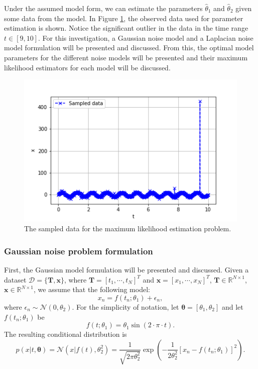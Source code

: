 \documentclass{article}
\begin{document}
Under the assumed model form, we can estimate the parameters $\hat{\theta}_1$ and $\hat{\theta}_2$ given some data from the model. In Figure \ref{fig:Q3b_1}, the observed data used for parameter estimation is shown. Notice the significant outlier in the data in the time range $t \in [9, 10]$. For this investigation, a Gaussian noise model and a Laplacian noise model formulation will be presented and discussed. From this, the optimal model parameters for the different noise models will be presented and their maximum likelihood estimators for each model will be discussed.
\begin{figure}[!htb]
    \centering
    \includegraphics[scale = 0.7]{Q3b_fig1.png}
    \caption{The sampled data for the maximum likelihood estimation problem.}
    \label{fig:Q3b_1}
\end{figure}

\subsubsection{Gaussian noise problem formulation}
First, the Gaussian model formulation will be presented and discussed. Given a dataset $\mathcal{D} = \{ \mathbf{T}, \mathbf{x}\}$, where $\mathbf{T} = [t_1, \cdots, t_N]^T$ and $\mathbf{x} = [x_1, \cdots, x_N]^T$, $\mathbf{T} \in \mathbb{R}^{N \times 1}$, $\mathbf{x} \in \mathbb{R}^{N \times 1}$, we assume that the following model:
\begin{equation}
x_n = f(t_n; \theta_1) + \epsilon_n,
\end{equation}
where $\epsilon_n \sim \mathcal{N}(0, \theta_2)$. For the simplicity of notation, let $\boldsymbol\theta = \left[\theta_1, \theta_2\right]$ and let  $f(t_n; \theta_1)$ be
\begin{equation}
f(t; \theta_1) = \theta_1 \sin \left(2 \cdot \pi \cdot t \right).
\end{equation}
The resulting conditional distribution is
\begin{equation}
p(x \vert t, \boldsymbol\theta) = \mathcal{N}(x \vert f(t), \theta_2^2) = \frac{1}{\sqrt{2\pi\theta_2^2}} \exp\left( -\frac{1}{2\theta_2^2}\left[x_n - f(t_n;\theta_1) \right]^2\right).
\end{equation}
\end{document}
